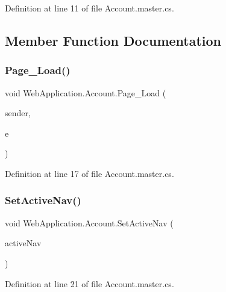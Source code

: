 Definition at line 11 of file Account.\+master.\+cs.



\subsection{Member Function Documentation}
\mbox{\label{classWebApplication_1_1Account_ae857a22942da6ad8aaaa0022dd7a5c78}} 
\subsubsection{\texorpdfstring{Page\_Load()}{Page\_Load()}}
{\footnotesize\ttfamily void Web\+Application.\+Account.\+Page\+\_\+\+Load (\begin{DoxyParamCaption}\item[{object}]{sender,  }\item[{Event\+Args}]{e }\end{DoxyParamCaption})\hspace{0.3cm}{\ttfamily [protected]}}



Definition at line 17 of file Account.\+master.\+cs.

\mbox{\label{classWebApplication_1_1Account_a56297d5833d2640c12bb6fbd606637a6}} 
\subsubsection{\texorpdfstring{SetActiveNav()}{SetActiveNav()}}
{\footnotesize\ttfamily void Web\+Application.\+Account.\+Set\+Active\+Nav (\begin{DoxyParamCaption}\item[{\mbox{\hyperlink{classWebApplication_1_1Account_a10ae11fc0b7ab15a9407a87d6c112809}{Active\+Nav}}}]{active\+Nav }\end{DoxyParamCaption})}



Definition at line 21 of file Account.\+master.\+cs.



